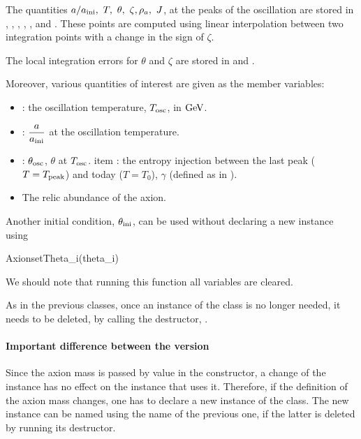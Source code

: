 \documentclass[11pt,a4paper]{article}
\begin{document}
The quantities $a/\ai, \ T, \ \theta, \ \zeta, \rho_a, \ J$, at the peaks of the oscillation are stored in  , , , , , and . These points are computed using linear interpolation between two integration points with a change in the sign of $\zeta$.


The local integration errors for $\theta$ and $\zeta$ are stored in	 and .


Moreover, various quantities of interest are given as the member variables:
%
\begin{itemize}
	\item {}: the oscillation temperature, $T_{\rm osc}{}$, in ${\rm GeV}$.
	\item {}: $\dfrac{a}{a_{\rm ini}{}}$ at the oscillation temperature.
	\item {}: $\theta_{\rm osc}{}$, \ie $\theta$ at $T_{\rm osc}{}$.
	item  : the entropy injection between the last peak ($T=T_{\rm peak}$) and today ($T=T_0$), $\gamma$ (defined as in ).
	\item {} The relic abundance of the axion.
\end{itemize}
%



Another initial condition, $\theta_{\rm ini}{}$, can be used without declaring a new instance using
%
\begin{py}
	AxionsetTheta_i(theta_i)
\end{py}
%
We should note that running this function all variables are cleared. 

As in the previous \PY classes, once an instance of the  class is no longer needed, it needs to be deleted, by calling the destructor, . 

\paragraph{Important difference between the \CPP version} Since the axion mass is passed by value in the constructor, a change of the   instance has no effect on the  instance that uses it. Therefore, if the definition of the axion mass changes, one has to declare a new instance of the  class. The new instance can be named using the name of the previous one, if the latter is deleted by running its destructor.
\end{document}
